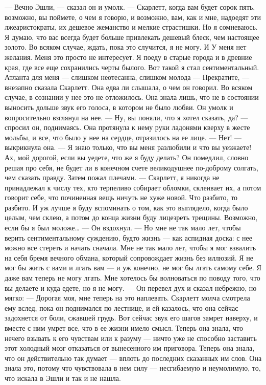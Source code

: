 — Вечно Эшли, — сказал он и умолк. — Скарлетт, когда вам будет сорок пять, возможно, вы поймете, о чем я говорю, и возможно, вам, как и мне, надоедят эти лжеаристократы, их дешевое жеманство и мелкие страстишки. Но я сомневаюсь. Я думаю, что вас всегда будет больше привлекать дешевый блеск, чем настоящее золото. Во всяком случае, ждать, пока это случится, я не могу. И У меня нет желания. Меня это просто не интересует. Я поеду в старые города и в древние края, где все еще сохранились черты былого. Вот такой я стал сентиментальный. Атланта для меня — слишком неотесанна, слишком молода — Прекратите, — внезапно сказала Скарлетт. Она едва ли слышала, о чем он говорил. Во всяком случае, в сознании у нее это не отложилось. Она знала лишь, что не в состоянии выносить дольше звук его голоса, в котором не было любви.
Он умолк и вопросительно взглянул на нее.
— Ну, вы поняли, что я хотел сказать, да? — спросил он, поднимаясь.
Она протянула к нему руки ладонями кверху в жесте мольбы, и все, что было у нее на сердце, отразилось на ее лице.
— Нет! — выкрикнула она. — Я знаю только, что вы меня разлюбили и что вы уезжаете! Ах, мой дорогой, если вы уедете, что же я буду делать?
Он помедлил, словно решая про себя, не будет ли в конечном счете великодушнее по-доброму солгать, чем сказать правду. Затем пожал плечами.
— Скарлетт, я никогда не принадлежал к числу тех, кто терпеливо собирает обломки, склеивает их, а потом говорит себе, что починенная вещь ничуть не хуже новой. Что разбито, то разбито. И уж лучше я буду вспоминать о том, как это выглядело, когда было целым, чем склею, а потом до конца жизни буду лицезреть трещины. Возможно, если бы я был моложе… — Он вздохнул. — Но мне не так мало лет, чтобы верить сентиментальному суждению, будто жизнь — как аспидная доска: с нее можно все стереть и начать сначала. Мне не так мало лет, чтобы я мог взвалить на себя бремя вечного обмана, который сопровождает жизнь без иллюзий. Я не мог бы жить с вами и лгать вам — и уж конечно, не мог бы лгать самому себе. Я даже вам теперь не могу лгать. Мне хотелось бы волноваться по поводу того, что вы делаете и куда едете, но я не могу. — Он перевел дух и сказал небрежно, но мягко: — Дорогая моя, мне теперь на это наплевать.
Скарлетт молча смотрела ему вслед, пока он поднимался по лестнице, и ей казалось, что она сейчас задохнется от боли, сжавшей грудь. Вот сейчас звук его шагов замрет наверху, и вместе с ним умрет все, что в ее жизни имело смысл. Теперь она знала, что нечего взывать к его чувствам или к разуму — ничто уже не способно заставить этот холодный мозг отказаться от вынесенного им приговора. Теперь она знала, что он действительно так думает — вплоть до последних сказанных им слов. Она знала это, потому что чувствовала в нем силу — несгибаемую и неумолимую, то, что искала в Эшли и так и не нашла.
